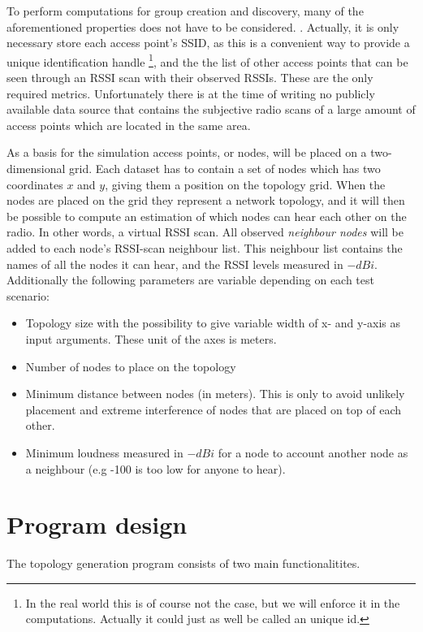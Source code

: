 To perform computations for group creation and discovery, many of the aforementioned properties does not have to be considered. .
Actually, it is only necessary store each access point's SSID, as this is a convenient way to provide a unique identification handle \footnote{In the real world this is of course not the case,
but we will enforce it in the computations. Actually it could just as well be called an unique id.}, and the the list of other access points that can be seen through an RSSI scan with
their observed RSSIs. These are the only required metrics. Unfortunately there is at the time of writing no publicly available data source that contains the subjective radio scans
of a large amount of access points which are located in the same area.

As a basis for the simulation access points, or nodes, will be placed on a two-dimensional grid. Each dataset has to contain a set of nodes which has two coordinates $x$ and $y$,
giving them a position on the topology grid. When the nodes are placed on the grid they represent a network topology, and it will then be possible to compute an
estimation of which nodes can hear each other on the radio. In other words, a virtual RSSI scan. All observed \textit{neighbour nodes} will be added to each node's RSSI-scan neighbour list.
This neighbour list contains the names of all the nodes it can hear, and the RSSI levels measured in $-dBi$.
Additionally the following parameters are variable depending on each test scenario:

\begin{itemize}
	\item Topology size with the possibility to give variable width of x- and y-axis as input arguments. These unit of the axes is meters. 
	\item Number of nodes to place on the topology
	\item Minimum distance between nodes (in meters). This is only to avoid unlikely placement and extreme interference of nodes that are placed on top of each other. 
	\item Minimum loudness measured in $-dBi$ for a node to account another node as a neighbour (e.g -100 is too low for anyone to hear).
\end{itemize}


	\section{Program design}\label{prog_design}
	The topology generation program consists of two main functionalitites.

